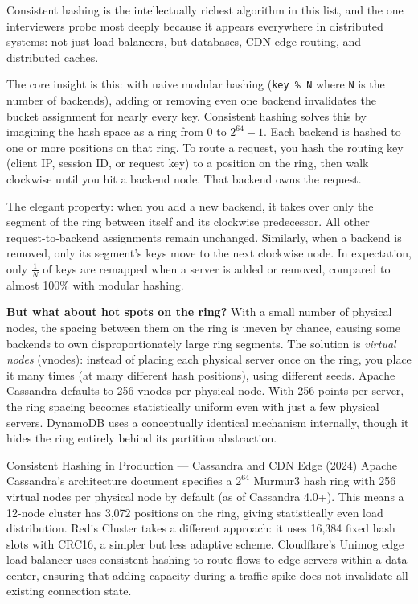 \documentclass[11pt,a4paper]{article}
\begin{document}
Consistent hashing is the intellectually richest algorithm in this list, and the one interviewers
probe most deeply because it appears everywhere in distributed systems: not just load balancers, but
databases, CDN edge routing, and distributed caches.

The core insight is this: with naive modular hashing (\texttt{key \% N} where \texttt{N} is the
number of backends), adding or removing even one backend invalidates the bucket assignment for
nearly every key. Consistent hashing solves this by imagining the hash space as a ring from 0 to
$2^{64}-1$. Each backend is hashed to one or more positions on that ring. To route a request, you
hash the routing key (client IP, session ID, or request key) to a position on the ring, then walk
clockwise until you hit a backend node. That backend owns the request.

The elegant property: when you add a new backend, it takes over only the segment of the ring
between itself and its clockwise predecessor. All other request-to-backend assignments remain
unchanged. Similarly, when a backend is removed, only its segment's keys move to the next clockwise
node. In expectation, only $\frac{1}{N}$ of keys are remapped when a server is added or removed,
compared to almost 100\% with modular hashing.

\begin{thinkbox}
  \textbf{But what about hot spots on the ring?} With a small number of physical nodes, the spacing
  between them on the ring is uneven by chance, causing some backends to own disproportionately
  large ring segments. The solution is \emph{virtual nodes} (vnodes): instead of placing each
  physical server once on the ring, you place it many times (at many different hash positions),
  using different seeds. Apache Cassandra defaults to 256 vnodes per physical node. With 256 points
  per server, the ring spacing becomes statistically uniform even with just a few physical servers.
  DynamoDB uses a conceptually identical mechanism internally, though it hides the ring entirely
  behind its partition abstraction.
\end{thinkbox}

\begin{industrybox}{Consistent Hashing in Production --- Cassandra and CDN Edge (2024)}
  Apache Cassandra's architecture document specifies a $2^{64}$ Murmur3 hash ring with 256 virtual
  nodes per physical node by default (as of Cassandra 4.0+). This means a 12-node cluster has
  3,072 positions on the ring, giving statistically even load distribution. Redis Cluster takes a
  different approach: it uses 16,384 fixed hash slots with CRC16, a simpler but less adaptive
  scheme. Cloudflare's Unimog edge load balancer uses consistent hashing to route flows to edge
  servers within a data center, ensuring that adding capacity during a traffic spike does not
  invalidate all existing connection state.
\end{industrybox}
\end{document}
